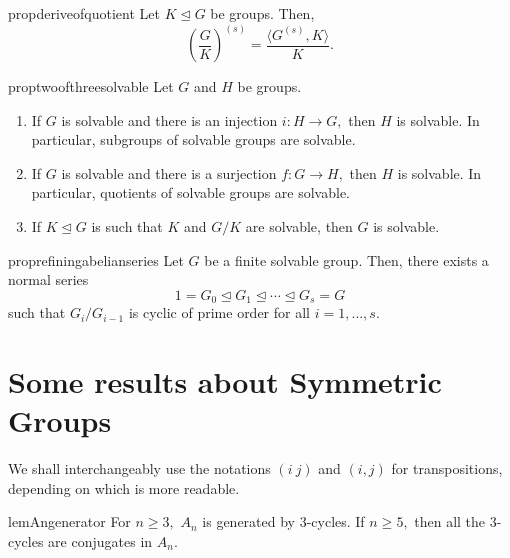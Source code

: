 \begin{restatable}[]{prop}{deriveofquotient}
\label{prop:deriveofquotient}
	Let $K \unlhd G$ be groups. Then,
	\begin{equation*} 
		\left(\frac{G}{K}\right)^{(s)} = \frac{\langle G^{(s)}, K\rangle}{K}.
	\end{equation*}
	\hfill\hyperref[prop:deriveofquotient2]{\downsym}
\end{restatable}

\begin{restatable}[]{prop}{twoofthreesolvable}
\label{prop:twoofthreesolvable}
	Let $G$ and $H$ be groups.
	\begin{enumerate}
	 	\item If $G$ is solvable and there is an injection $i : H \to G,$ then $H$ is solvable. In particular, subgroups of solvable groups are solvable.
	 	\item If $G$ is solvable and there is a surjection $f : G \to H,$ then $H$ is solvable. In particular, quotients of solvable groups are solvable.
	 	\item If $K \unlhd G$ is such that $K$ and $G/K$ are solvable, then $G$ is solvable. \hfill\hyperref[prop:twoofthreesolvable2]{\downsym}
	\end{enumerate} 
\end{restatable}

\begin{restatable}[]{prop}{refiningabelianseries}
\label{prop:refiningabelianseries}
	Let $G$ be a finite solvable group. Then, there exists a normal series
	\begin{equation*} 
		1 = G_0 \unlhd G_1 \unlhd \cdots \unlhd G_s = G
	\end{equation*}
	such that $G_i/G_{i - 1}$ is cyclic of prime order for all $i = 1, \ldots, s.$ \hfill\hyperref[prop:refiningabelianseries2]{\downsym}
\end{restatable}

\section{Some results about Symmetric Groups}

We shall interchangeably use the notations $(i \ j)$ and $(i, j)$ for transpositions, depending on which is more readable.

\begin{restatable}[]{lem}{Angenerator}
\label{lem:Angenerator}
	For $n \ge 3,$ $A_n$ is generated by $3$-cycles. If $n \ge 5,$ then all the $3$-cycles are conjugates in $A_n.$ \hfill\hyperref[lem:Angenerator2]{\downsym}
\end{restatable}

